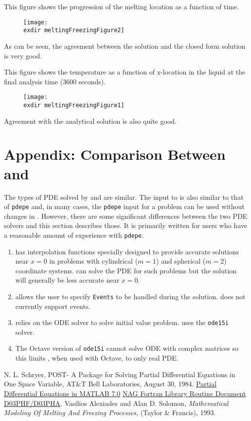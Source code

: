 \documentclass{article}
\begin{document}
This figure shows the progression of the melting location as a function of time.
\begin{figure}[H]
	\centering
	\texttt{[image: \\exdir meltingFreezingFigure2]}
	\label{fig:meltingFreezingFigure2}
\end{figure}
As can be seen, the agreement between the \pde solution and the closed form
solution is very good.

This figure shows the temperature as a function of x-location in the
liquid at the final analysis time (3600 seconds).
\begin{figure}[H]
	\centering
	\texttt{[image: \\exdir meltingFreezingFigure1]}
	\label{fig:meltingFreezingFigure1}
\end{figure}
Agreement with the analytical solution is also quite good.



\newpage
\appendix
\section{Appendix: Comparison Between \pde and \ml \pdepe} \label{sec:pdepe} 
The types of PDE solved by \pde and  are similar. The input to \pde is
also similar to that of {\tt pdepe} and, in many cases, the  {\tt pdepe} input for a
problem can be used without changes in \pde. However, there are some significant differences
between the two PDE solvers and this section describes those. It is primarily written for users
who have a reasonable amount of experience with {\tt pdepe}.

\begin{enumerate}
\item
\pdepe has interpolation functions specially designed to provide accurate solutions near $x=0$
in problems with cylindrical ($m=1$) and spherical ($m=2$) coordinate systems. \pde can solve
the PDE for such problems but the solution will generally be less accurate near $x=0$.
\item
\pdepe allows the user to specify {\tt Events} to be handled during the solution. \pde does not currently support events.
\item
\pdepe relies on the  ODE solver to solve initial value problem. \pde uses the {\tt ode15i} solver.
\item 
The Octave version of {\tt ode15i} cannot solve ODE with complex matrices so this limits
\pde, when used with Octave, to only real PDE.
\end{enumerate}

\begin{thebibliography}{99}
 N. L. Schryer, POST- A Package for Solving Partial
Differential Equations in One Space Variable, AT\&T Bell Laboratories,
August 30, 1984.
\href{https://www.math.tamu.edu/~phoward/m401/pdemat.pdf}
{Partial Differential Equations in MATLAB 7.0}
\href{https://www.nag.co.uk/numeric/fl/manual/pdf/D03/d03phf.pdf}
{NAG Fortran Library Routine Document D03PHF/D03PHA}.
 Vasilios Alexiades and  Alan D. Solomon,
 {\it Mathematical Modeling Of Melting And Freezing Processes},
 (Taylor \& Francis), 1993.
\end{thebibliography}
\end{document}
